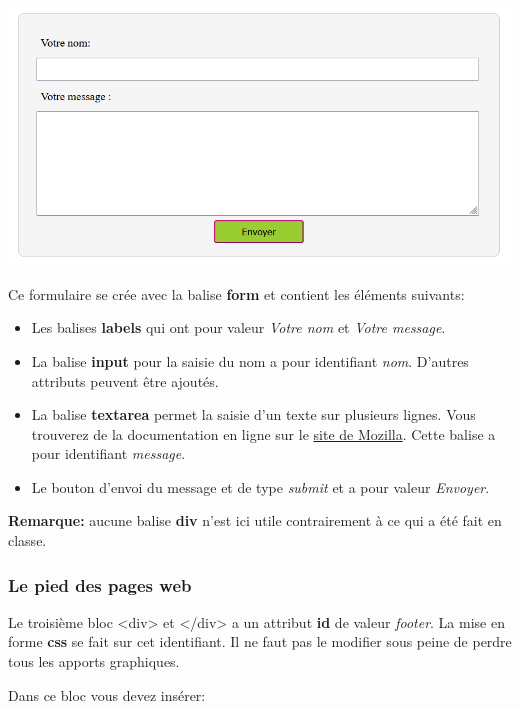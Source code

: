 \includegraphics{img/formulaire.png}

Ce formulaire se crée avec la balise \textbf{form} et contient les
éléments suivants:

\begin{itemize}
\tightlist
\item
  Les balises \textbf{labels} qui ont pour valeur \emph{Votre nom} et
  \emph{Votre message}.
\item
  La balise \textbf{input} pour la saisie du nom a pour identifiant
  \emph{nom}. D'autres attributs peuvent être ajoutés.
\item
  La balise \textbf{textarea} permet la saisie d'un texte sur plusieurs
  lignes. Vous trouverez de la documentation en ligne sur le
  \href{https://developer.mozilla.org/fr/docs/Web/HTML/Element/Textarea}{site
  de Mozilla}. Cette balise a pour identifiant \emph{message}.
\item
  Le bouton d'envoi du message et de type \emph{submit} et a pour valeur
  \emph{Envoyer}.
\end{itemize}

\textbf{Remarque:} aucune balise \textbf{div} n'est ici utile
contrairement à ce qui a été fait en classe.

\hypertarget{le-pied-des-pages-web}{%
\subsubsection{Le pied des pages web}\label{le-pied-des-pages-web}}

Le troisième bloc \textless div\textgreater{} et
\textless/div\textgreater{} a un attribut \textbf{id} de valeur
\emph{footer}. La mise en forme \textbf{css} se fait sur cet
identifiant. Il ne faut pas le modifier sous peine de perdre tous les
apports graphiques.

Dans ce bloc vous devez insérer:

